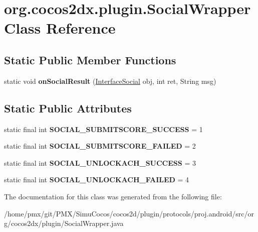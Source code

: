 \hypertarget{classorg_1_1cocos2dx_1_1plugin_1_1SocialWrapper}{}\section{org.\+cocos2dx.\+plugin.\+Social\+Wrapper Class Reference}
\label{classorg_1_1cocos2dx_1_1plugin_1_1SocialWrapper}
\subsection*{Static Public Member Functions}
\begin{DoxyCompactItemize}
\item 
\mbox{\label{classorg_1_1cocos2dx_1_1plugin_1_1SocialWrapper_a8049f24f57e5dda1c8a48ec8c679cbec}} 
static void {\bfseries on\+Social\+Result} (\hyperlink{interfaceorg_1_1cocos2dx_1_1plugin_1_1InterfaceSocial}{Interface\+Social} obj, int ret, String msg)
\end{DoxyCompactItemize}
\subsection*{Static Public Attributes}
\begin{DoxyCompactItemize}
\item 
\mbox{\label{classorg_1_1cocos2dx_1_1plugin_1_1SocialWrapper_a4a0562386024b5562093cbed2cb93986}} 
static final int {\bfseries S\+O\+C\+I\+A\+L\+\_\+\+S\+U\+B\+M\+I\+T\+S\+C\+O\+R\+E\+\_\+\+S\+U\+C\+C\+E\+SS} = 1
\item 
\mbox{\label{classorg_1_1cocos2dx_1_1plugin_1_1SocialWrapper_a1b28937cb3d6b54f9b96d1e7109e5edc}} 
static final int {\bfseries S\+O\+C\+I\+A\+L\+\_\+\+S\+U\+B\+M\+I\+T\+S\+C\+O\+R\+E\+\_\+\+F\+A\+I\+L\+ED} = 2
\item 
\mbox{\label{classorg_1_1cocos2dx_1_1plugin_1_1SocialWrapper_acd84e34390e3aa404ee83288aa3bac72}} 
static final int {\bfseries S\+O\+C\+I\+A\+L\+\_\+\+U\+N\+L\+O\+C\+K\+A\+C\+H\+\_\+\+S\+U\+C\+C\+E\+SS} = 3
\item 
\mbox{\label{classorg_1_1cocos2dx_1_1plugin_1_1SocialWrapper_aa85d41a9c4f9abb6b4e98dd6b849eeb7}} 
static final int {\bfseries S\+O\+C\+I\+A\+L\+\_\+\+U\+N\+L\+O\+C\+K\+A\+C\+H\+\_\+\+F\+A\+I\+L\+ED} = 4
\end{DoxyCompactItemize}


The documentation for this class was generated from the following file\+:\begin{DoxyCompactItemize}
\item 
/home/pmx/git/\+P\+M\+X/\+Simu\+Cocos/cocos2d/plugin/protocols/proj.\+android/src/org/cocos2dx/plugin/Social\+Wrapper.\+java\end{DoxyCompactItemize}
